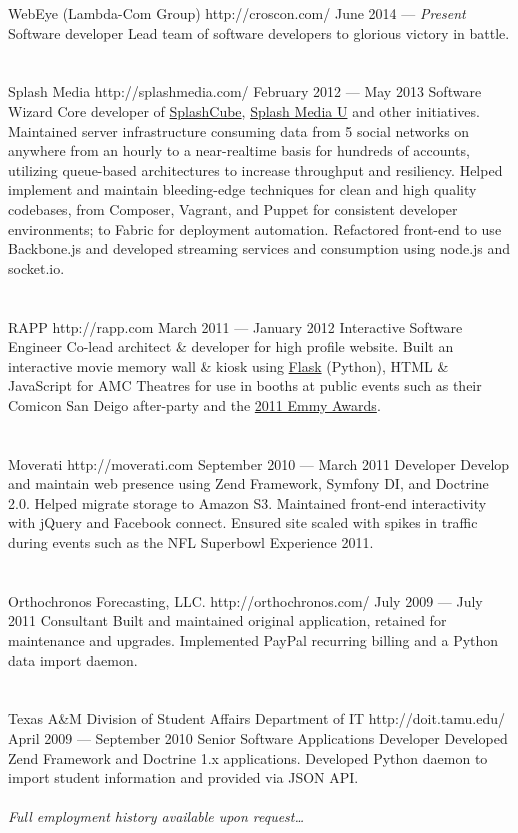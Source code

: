 \documentclass{resume}
\begin{document}
\employer
	{WebEye (Lambda-Com Group)}
	{http://croscon.com/}
	{June 2014 --- \emph{Present}}
	{Software developer}
	{Lead team of software developers to glorious victory in battle.}
\\ \\ \\
\employer
	{Splash Media}
	{http://splashmedia.com/}
	{February 2012 --- May 2013}
	{Software Wizard}
	{Core developer of \href{http://splashcube.com/}{SplashCube}, \href{http://splashmediau.com/}{Splash Media U} and other initiatives. Maintained server infrastructure consuming data from 5 social networks on anywhere from an hourly to a near-realtime basis for hundreds of accounts, utilizing queue-based architectures to increase throughput and resiliency. Helped implement and maintain bleeding-edge techniques for clean and high quality codebases, from Composer, Vagrant, and Puppet for consistent developer environments; to Fabric for deployment automation. Refactored front-end to use Backbone.js and developed streaming services and consumption using node.js and socket.io.}
\\ \\ \\
\employer
	{RAPP}
	{http://rapp.com}
	{March 2011 --- January 2012}
	{Interactive Software Engineer}
	{Co-lead architect \& developer for high profile website. Built an interactive movie memory wall \& kiosk using \href{http://flask.pocoo.org/}{Flask} (Python), HTML \& JavaScript for AMC Theatres for use in booths at public events such as their Comicon San Deigo after-party and the \href{http://www.accesshollywood.com/backstage-at-the-emmys/emmys-2011-backstage-at-the-hp-touchsmart-gift-lounge-day-1_gallerytab_3129/20}{2011 Emmy Awards}.}
\\ \\ \\
\employer
	{Moverati}
	{http://moverati.com}
	{September 2010 --- March 2011}
	{Developer}
	{Develop and maintain web presence using Zend Framework, Symfony DI, and Doctrine 2.0. Helped migrate storage to Amazon S3. Maintained front-end interactivity with jQuery and Facebook connect. Ensured site scaled with spikes in traffic during events such as the NFL Superbowl Experience 2011.}
\\ \\ \\
\employer
	{Orthochronos Forecasting, LLC.}
	{http://orthochronos.com/}
	{July 2009 --- July 2011}
	{Consultant}
	{Built and maintained original application, retained for maintenance and upgrades. Implemented PayPal recurring billing and a Python data import daemon.}
\\ \\ \\
\employer
	{Texas A\&M Division of Student Affairs Department of IT}
	{http://doit.tamu.edu/}
	{April 2009 --- September 2010}
	{Senior Software Applications Developer}
	{Developed Zend Framework and Doctrine 1.x applications. Developed Python daemon to import student information and provided via JSON API.}
\\ \\
\emph{Full employment history available upon request\ldots}
\end{document}
